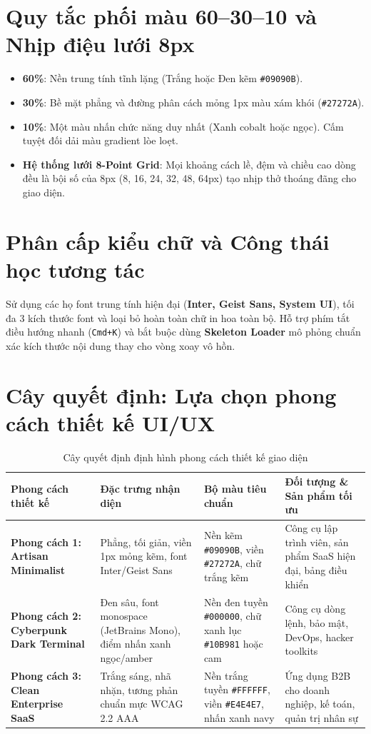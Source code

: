 \documentclass[a4paper,11pt]{report}
\begin{document}
\section{Quy tắc phối màu 60--30--10 và Nhịp điệu lưới 8px}
\begin{itemize}[leftmargin=1.5em]
    \item \textbf{60\%}: Nền trung tính tĩnh lặng (Trắng hoặc Đen kẽm \texttt{\#09090B}).
    \item \textbf{30\%}: Bề mặt phẳng và đường phân cách mỏng 1px màu xám khói (\texttt{\#27272A}).
    \item \textbf{10\%}: Một màu nhấn chức năng duy nhất (Xanh cobalt hoặc ngọc). Cấm tuyệt đối dải màu gradient lòe loẹt.
    \item \textbf{Hệ thống lưới 8-Point Grid}: Mọi khoảng cách lề, đệm và chiều cao dòng đều là bội số của 8px (8, 16, 24, 32, 48, 64px) tạo nhịp thở thoáng đãng cho giao diện.
\end{itemize}

\section{Phân cấp kiểu chữ và Công thái học tương tác}
Sử dụng các họ font trung tính hiện đại (\textbf{Inter, Geist Sans, System UI}), tối đa 3 kích thước font và loại bỏ hoàn toàn chữ in hoa toàn bộ. Hỗ trợ phím tắt điều hướng nhanh (\texttt{Cmd+K}) và bắt buộc dùng \textbf{Skeleton Loader} mô phỏng chuẩn xác kích thước nội dung thay cho vòng xoay vô hồn.

\section{Cây quyết định: Lựa chọn phong cách thiết kế UI/UX}

\begin{table}[htbp]
\centering
\small
\caption{Cây quyết định định hình phong cách thiết kế giao diện}
\vspace{0.5em}
\begin{tabularx}{\textwidth}{L{3.2cm} L{3.8cm} L{4.5cm} Y}
\toprule
\textbf{Phong cách thiết kế} & \textbf{Đặc trưng nhận diện} & \textbf{Bộ màu tiêu chuẩn} & \textbf{Đối tượng \& Sản phẩm tối ưu} \\
\midrule
\textbf{Phong cách 1: Artisan Minimalist} & Phẳng, tối giản, viền 1px mỏng kẽm, font Inter/Geist Sans & Nền kẽm \texttt{\#09090B}, viền \texttt{\#27272A}, chữ trắng kẽm & Công cụ lập trình viên, sản phẩm SaaS hiện đại, bảng điều khiển \\
\textbf{Phong cách 2: Cyberpunk Dark Terminal} & Đen sâu, font monospace (JetBrains Mono), điểm nhấn xanh ngọc/amber & Nền đen tuyền \texttt{\#000000}, chữ xanh lục \texttt{\#10B981} hoặc cam & Công cụ dòng lệnh, bảo mật, DevOps, hacker toolkits \\
\textbf{Phong cách 3: Clean Enterprise SaaS} & Trắng sáng, nhã nhặn, tương phản chuẩn mực WCAG 2.2 AAA & Nền trắng tuyền \texttt{\#FFFFFF}, viền \texttt{\#E4E4E7}, nhấn xanh navy & Ứng dụng B2B cho doanh nghiệp, kế toán, quản trị nhân sự \\
\bottomrule
\end{tabularx}
\end{table}
\end{document}
